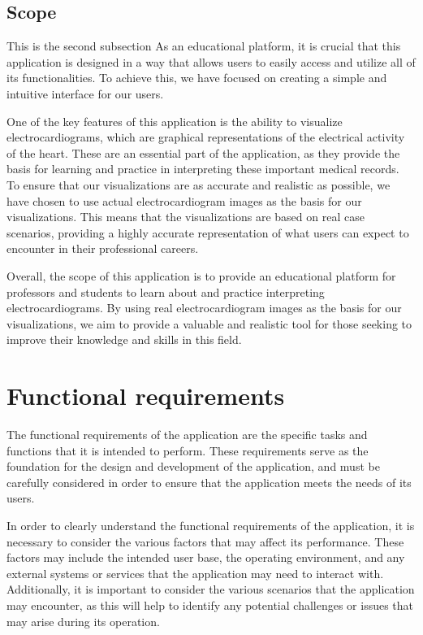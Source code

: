 \documentclass[singlespacing,12pt,parskip,headsepline,consistentlayout]{article}
\begin{document}
\subsection{Scope}

This is the second subsection
As an educational platform, it is crucial that this application is designed in a way that allows users to easily access and utilize all of its functionalities. To achieve this, we have focused on creating a simple and intuitive interface for our users.

One of the key features of this application is the ability to visualize electrocardiograms, which are graphical representations of the electrical activity of the heart. These are an essential part of the application, as they provide the basis for learning and practice in interpreting these important medical records. To ensure that our visualizations are as accurate and realistic as possible, we have chosen to use actual electrocardiogram images as the basis for our visualizations. This means that the visualizations are based on real case scenarios, providing a highly accurate representation of what users can expect to encounter in their professional careers.

Overall, the scope of this application is to provide an educational platform for professors and students to learn about and practice interpreting electrocardiograms. By using real electrocardiogram images as the basis for our visualizations, we aim to provide a valuable and realistic tool for those seeking to improve their knowledge and skills in this field.

\section{Functional requirements}

The functional requirements of the application are the specific tasks and functions that it is intended to perform. These requirements serve as the foundation for the design and development of the application, and must be carefully considered in order to ensure that the application meets the needs of its users.

In order to clearly understand the functional requirements of the application, it is necessary to consider the various factors that may affect its performance. These factors may include the intended user base, the operating environment, and any external systems or services that the application may need to interact with. Additionally, it is important to consider the various scenarios that the application may encounter, as this will help to identify any potential challenges or issues that may arise during its operation.
\end{document}
